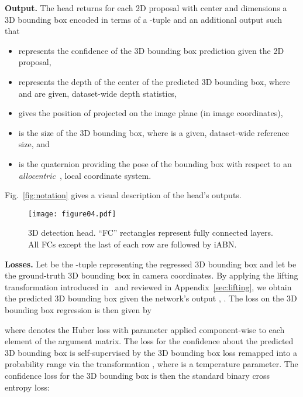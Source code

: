 \documentclass[10pt,twocolumn,letterpaper]{article}
\newcommand{\iABN}{iABN\xspace}
\renewcommand{\paragraph}[1]{

        \vspace{3pt}
	\noindent\textbf{#1}}
\begin{document}
\paragraph{Output.} The head returns for each 2D proposal  with center  and dimensions   a 3D bounding box encoded in terms of a -tuple  and an additional output  such that
\begin{itemize}
    \item  represents the confidence of the 3D bounding box prediction given the 2D proposal,
    \item  represents the depth of the center  of the predicted 3D bounding box, where  and  are given, dataset-wide depth statistics, 
    \item  gives the position of  projected on the image plane (in image coordinates),
    \item  is the size of the 3D bounding box, where  is a given, dataset-wide reference size, and
    \item  is the quaternion providing the pose of the bounding box with respect to an \emph{allocentric}~\cite{Kundu_2018_CVPR}, local coordinate system.
\end{itemize}
Fig.~\ref{fig:notation} gives a visual description of the head's outputs.

\begin{figure}
    \centering
    \texttt{[image: figure04.pdf]}
    \caption{3D detection head. ``FC'' rectangles represent fully connected layers. All FCs except the last of each row are followed by \iABN.}
    \label{fig:head3d}
    \vspace{-12pt}
\end{figure}

\paragraph{Losses.}
Let  be the -tuple representing the regressed 3D bounding box and let  be the ground-truth 3D bounding box in camera coordinates.
By applying the lifting transformation  introduced in~\cite{Manhardt_2019_CVPR} and reviewed in Appendix~\ref{sec:lifting}, we obtain the predicted 3D bounding box  given the network's output , \ie .
The loss on the 3D bounding box regression is then given by

where  denotes the Huber loss with parameter  applied component-wise to each element of the argument matrix.
The loss for the confidence  about the predicted 3D bounding box is self-supervised by the 3D bounding box loss remapped into a probability range via the transformation , where  is a temperature parameter. The confidence loss for the 3D bounding box is then the standard binary cross entropy loss:
\end{document}
